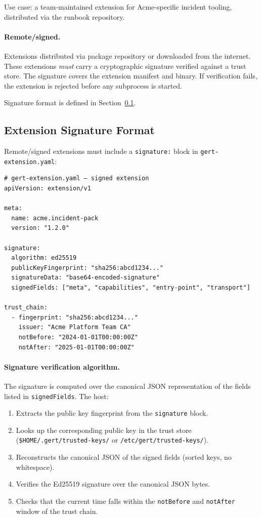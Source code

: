 Use case: a team-maintained extension for Acme-specific incident tooling,
distributed via the runbook repository.

\paragraph{Remote/signed.}
Extensions distributed via package repository or downloaded from the internet.
These extensions \emph{must} carry a cryptographic signature verified against a
trust store.  The signature covers the extension manifest and binary.  If
verification fails, the extension is rejected before any subprocess is started.

Signature format is defined in Section~\ref{sec:extension-signature}.

\subsection{Extension Signature Format}
\label{sec:extension-signature}

Remote/signed extensions must include a \texttt{signature:} block in
\texttt{gert-extension.yaml}:

\begin{verbatim}
# gert-extension.yaml — signed extension
apiVersion: extension/v1

meta:
  name: acme.incident-pack
  version: "1.2.0"

signature:
  algorithm: ed25519
  publicKeyFingerprint: "sha256:abcd1234..."
  signatureData: "base64-encoded-signature"
  signedFields: ["meta", "capabilities", "entry-point", "transport"]

trust_chain:
  - fingerprint: "sha256:abcd1234..."
    issuer: "Acme Platform Team CA"
    notBefore: "2024-01-01T00:00:00Z"
    notAfter: "2025-01-01T00:00:00Z"
\end{verbatim}

\paragraph{Signature verification algorithm.}
The signature is computed over the canonical JSON representation of the fields
listed in \texttt{signedFields}.  The host:

\begin{enumerate}
  \item Extracts the public key fingerprint from the \texttt{signature} block.
  \item Looks up the corresponding public key in the trust store
        (\texttt{\$HOME/.gert/trusted-keys/} or
        \texttt{/etc/gert/trusted-keys/}).
  \item Reconstructs the canonical JSON of the signed fields (sorted keys,
        no whitespace).
  \item Verifies the Ed25519 signature over the canonical JSON bytes.
  \item Checks that the current time falls within the \texttt{notBefore} and
        \texttt{notAfter} window of the trust chain.
\end{enumerate}

